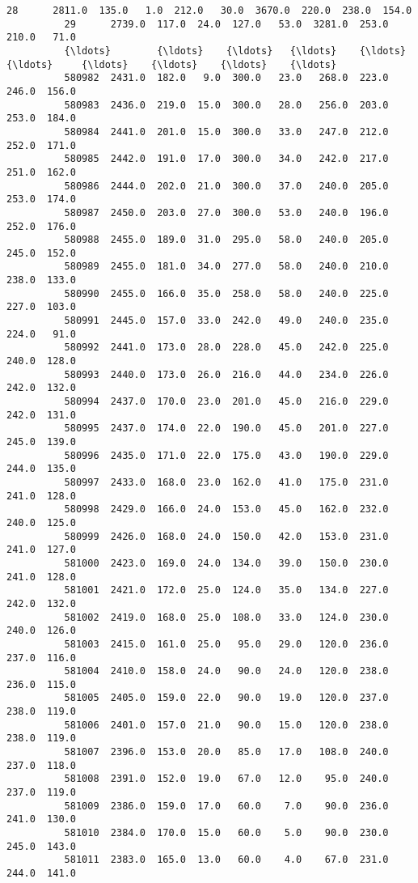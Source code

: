 \documentclass[11pt]{article}
\begin{document}
\begin{Verbatim}[commandchars=\\\{\}]
          28      2811.0  135.0   1.0  212.0   30.0  3670.0  220.0  238.0  154.0   
          29      2739.0  117.0  24.0  127.0   53.0  3281.0  253.0  210.0   71.0   
          {\ldots}        {\ldots}    {\ldots}   {\ldots}    {\ldots}    {\ldots}     {\ldots}    {\ldots}    {\ldots}    {\ldots}   
          580982  2431.0  182.0   9.0  300.0   23.0   268.0  223.0  246.0  156.0   
          580983  2436.0  219.0  15.0  300.0   28.0   256.0  203.0  253.0  184.0   
          580984  2441.0  201.0  15.0  300.0   33.0   247.0  212.0  252.0  171.0   
          580985  2442.0  191.0  17.0  300.0   34.0   242.0  217.0  251.0  162.0   
          580986  2444.0  202.0  21.0  300.0   37.0   240.0  205.0  253.0  174.0   
          580987  2450.0  203.0  27.0  300.0   53.0   240.0  196.0  252.0  176.0   
          580988  2455.0  189.0  31.0  295.0   58.0   240.0  205.0  245.0  152.0   
          580989  2455.0  181.0  34.0  277.0   58.0   240.0  210.0  238.0  133.0   
          580990  2455.0  166.0  35.0  258.0   58.0   240.0  225.0  227.0  103.0   
          580991  2445.0  157.0  33.0  242.0   49.0   240.0  235.0  224.0   91.0   
          580992  2441.0  173.0  28.0  228.0   45.0   242.0  225.0  240.0  128.0   
          580993  2440.0  173.0  26.0  216.0   44.0   234.0  226.0  242.0  132.0   
          580994  2437.0  170.0  23.0  201.0   45.0   216.0  229.0  242.0  131.0   
          580995  2437.0  174.0  22.0  190.0   45.0   201.0  227.0  245.0  139.0   
          580996  2435.0  171.0  22.0  175.0   43.0   190.0  229.0  244.0  135.0   
          580997  2433.0  168.0  23.0  162.0   41.0   175.0  231.0  241.0  128.0   
          580998  2429.0  166.0  24.0  153.0   45.0   162.0  232.0  240.0  125.0   
          580999  2426.0  168.0  24.0  150.0   42.0   153.0  231.0  241.0  127.0   
          581000  2423.0  169.0  24.0  134.0   39.0   150.0  230.0  241.0  128.0   
          581001  2421.0  172.0  25.0  124.0   35.0   134.0  227.0  242.0  132.0   
          581002  2419.0  168.0  25.0  108.0   33.0   124.0  230.0  240.0  126.0   
          581003  2415.0  161.0  25.0   95.0   29.0   120.0  236.0  237.0  116.0   
          581004  2410.0  158.0  24.0   90.0   24.0   120.0  238.0  236.0  115.0   
          581005  2405.0  159.0  22.0   90.0   19.0   120.0  237.0  238.0  119.0   
          581006  2401.0  157.0  21.0   90.0   15.0   120.0  238.0  238.0  119.0   
          581007  2396.0  153.0  20.0   85.0   17.0   108.0  240.0  237.0  118.0   
          581008  2391.0  152.0  19.0   67.0   12.0    95.0  240.0  237.0  119.0   
          581009  2386.0  159.0  17.0   60.0    7.0    90.0  236.0  241.0  130.0   
          581010  2384.0  170.0  15.0   60.0    5.0    90.0  230.0  245.0  143.0   
          581011  2383.0  165.0  13.0   60.0    4.0    67.0  231.0  244.0  141.0   
          

\end{Verbatim}
\end{document}
